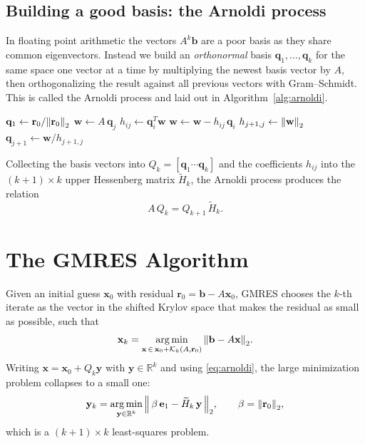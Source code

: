 \subsection{Building a good basis: the Arnoldi process}
\label{sec:arnoldi}

In floating point arithmetic the vectors $A^{k}\mathbf{b}$ are a poor basis as they share common eigenvectors. Instead we
build an \emph{orthonormal} basis $\mathbf{q}_1,\dots,\mathbf{q}_k$ for the
same space one vector at a time by multiplying the newest basis vector by $A$, then
orthogonalizing the result against all previous vectors with Gram--Schmidt. This
is called the Arnoldi process and laid out in Algorithm~\ref{alg:arnoldi}.

\begin{algorithm}[htbp]
\caption{Arnoldi process (modified Gram--Schmidt)}
\label{alg:arnoldi}
\begin{algorithmic}[1]
\State $\mathbf{q}_1 \gets \mathbf{r}_0 / \norm{\mathbf{r}_0}_2$
  \State $\mathbf{w} \gets A\,\mathbf{q}_j$ 
    \State $h_{ij} \gets \mathbf{q}_i^T \mathbf{w}$
    \State $\mathbf{w} \gets \mathbf{w} - h_{ij}\,\mathbf{q}_i$
  \EndFor
  \State $h_{j+1,j} \gets \norm{\mathbf{w}}_2$
  \State $\mathbf{q}_{j+1} \gets \mathbf{w} / h_{j+1,j}$
\EndFor
\end{algorithmic}
\end{algorithm}

Collecting the basis vectors into $Q_k = [\mathbf{q}_1 \cdots \mathbf{q}_k]$
and the coefficients $h_{ij}$ into the $(k+1)\times k$ upper Hessenberg matrix
$\widetilde{H}_k$, the Arnoldi process produces the relation
\begin{equation}
  A\,Q_k = Q_{k+1}\,\widetilde{H}_k .
  \label{eq:arnoldi}
\end{equation}


\section{The GMRES Algorithm}
\label{sec:gmres}

Given an initial guess $\mathbf{x}_0$ with residual
$\mathbf{r}_0 = \mathbf{b} - A\mathbf{x}_0$, GMRES chooses the $k$-th iterate
as the vector in the shifted Krylov space that makes the residual as small as
possible, such that
\begin{equation}
  \mathbf{x}_k = \operatorname*{arg\,min}_{\mathbf{x}\,\in\,\mathbf{x}_0 +
  \mathcal{K}_k(A,\mathbf{r}_0)} \norm{\mathbf{b} - A\mathbf{x}}_2 .
  \label{eq:gmres-min}
\end{equation}
Writing $\mathbf{x} = \mathbf{x}_0 + Q_k\mathbf{y}$ with
$\mathbf{y}\in\mathbb{R}^k$ and using \eqref{eq:arnoldi}, the large
minimization problem collapses to a small one:
\begin{equation}
  \mathbf{y}_k = \operatorname*{arg\,min}_{\mathbf{y}\in\mathbb{R}^k}
  \norm{\,\beta\,\mathbf{e}_1 - \widetilde{H}_k\,\mathbf{y}\,}_2,
  \qquad \beta = \norm{\mathbf{r}_0}_2 ,
  \label{eq:gmres-lsq}
\end{equation}
which is a $(k+1)\times k$ least-squares problem. 


